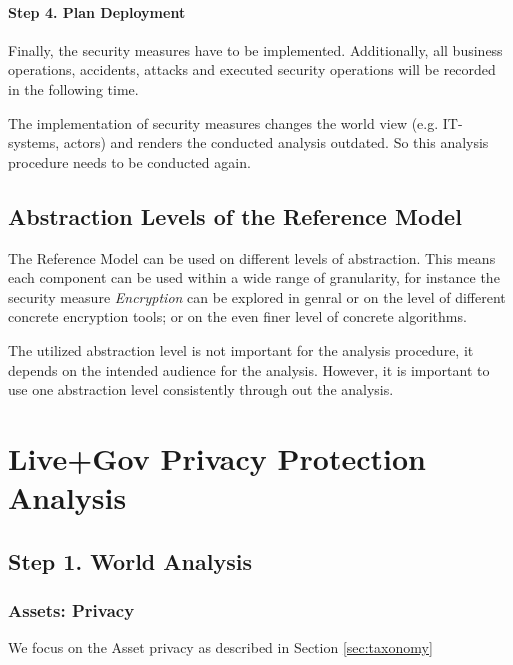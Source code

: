 \paragraph*{Step 4. Plan Deployment}

Finally, the security measures have to be implemented.
Additionally, all business operations, accidents, attacks and executed security operations will be recorded in the following time.

The implementation of security measures changes the world view (e.g. IT-systems, actors) and renders the conducted analysis outdated.
So this analysis procedure needs to be conducted again.

\subsection{Abstraction Levels of the Reference Model}

The Reference Model can be used on different levels of abstraction.
This means each component can be used within a wide range of granularity, for instance the security measure \emph{Encryption} can be explored in genral or on the level of different concrete encryption tools; or on the even finer level of concrete algorithms.

The utilized abstraction level is not important for the analysis procedure, it depends on the intended audience for the analysis.
However, it is important to use one abstraction level consistently through out the analysis.


\pagebreak

\section{Live+Gov Privacy Protection Analysis}

\subsection{Step 1. World Analysis}

\subsubsection{Assets: Privacy}

We focus on the Asset privacy as described in Section \ref{sec:taxonomy}


